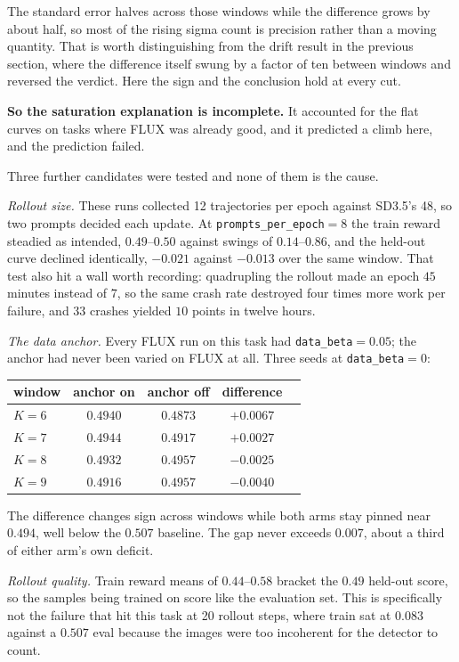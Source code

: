 \documentclass[11pt]{article}
\newcommand{\code}[1]{\texttt{\small #1}}
\begin{document}
The standard error halves across those windows while the difference grows by about half, so most of the rising sigma count is precision rather than a moving quantity. That is worth distinguishing from the drift result in the previous section, where the difference itself swung by a factor of ten between windows and reversed the verdict. Here the sign and the conclusion hold at every cut.

\textbf{So the saturation explanation is incomplete.} It accounted for the flat curves on tasks where FLUX was already good, and it predicted a climb here, and the prediction failed.

Three further candidates were tested and none of them is the cause.

\emph{Rollout size.} These runs collected 12 trajectories per epoch against SD3.5's 48, so two prompts decided each update. At \code{prompts\_per\_epoch}$=8$ the train reward steadied as intended, $0.49$--$0.50$ against swings of $0.14$--$0.86$, and the held-out curve declined identically, $-0.021$ against $-0.013$ over the same window. That test also hit a wall worth recording: quadrupling the rollout made an epoch $45$ minutes instead of $7$, so the same crash rate destroyed four times more work per failure, and $33$ crashes yielded $10$ points in twelve hours.

\emph{The data anchor.} Every FLUX run on this task had \code{data\_beta}$=0.05$; the anchor had never been varied on FLUX at all. Three seeds at \code{data\_beta}$=0$:

\begin{center}
\begin{tabular}{lcccc}
\toprule
window & anchor on & anchor off & difference \\
\midrule
$K{=}6$ & $0.4940$ & $0.4873$ & $+0.0067$ \\
$K{=}7$ & $0.4944$ & $0.4917$ & $+0.0027$ \\
$K{=}8$ & $0.4932$ & $0.4957$ & $-0.0025$ \\
$K{=}9$ & $0.4916$ & $0.4957$ & $-0.0040$ \\
\bottomrule
\end{tabular}
\end{center}

\noindent The difference changes sign across windows while both arms stay pinned near $0.494$, well below the $0.507$ baseline. The gap never exceeds $0.007$, about a third of either arm's own deficit.

\emph{Rollout quality.} Train reward means of $0.44$--$0.58$ bracket the $0.49$ held-out score, so the samples being trained on score like the evaluation set. This is specifically not the failure that hit this task at 20 rollout steps, where train sat at $0.083$ against a $0.507$ eval because the images were too incoherent for the detector to count.
\end{document}
